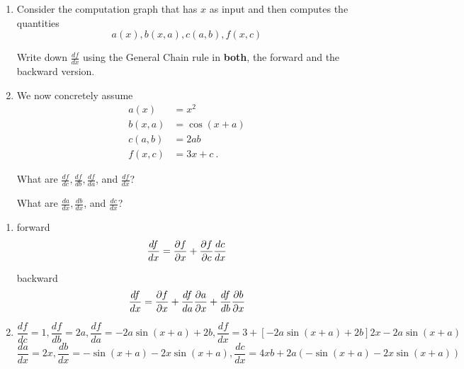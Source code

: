 

\renewcommand{\course}{Artificial Intelligence}
\renewcommand{\coursepicture}{course_ai}
\renewcommand{\coursedate}{Summer 2023}

\renewcommand{\exnum}{Exercise 6}

\exercises
\exercisestitle



\begin{enumerate}
\item Consider the computation graph that has $x$ as input and then computes
the quantities
$$ a(x), b(x,a), c(a,b), f(x,c) $$

Write down $\frac{df}{dx}$ using the General Chain rule in \textbf{both}, the forward and the backward version.

\item We now concretely assume
%
\begin{align*}
a(x) &= x^2 \\
b(x,a) &= \cos(x+a) \\
c(a,b) &= 2ab \\
f(x,c) &= 3x + c ~.
\end{align*}

What are $\frac{df}{dc}, \frac{df}{db}, \frac{df}{da}$, and $\frac{df}{dx}$? 

What are $\frac{da}{dx}, \frac{db}{dx}$, and $\frac{dc}{dx}$?
\end{enumerate}

\begin{solution}
\begin{enumerate}
\item forward
$$\frac{df}{dx} = \frac{\partial f}{\partial x} + \frac{\partial f}{\partial c} \frac{d c}{d x} $$

backward
$$\frac{df}{dx} = \frac{\partial f}{\partial x} + \frac{d f}{d a} \frac{\partial a}{\partial x} + \frac{d f}{d b} \frac{\partial b}{\partial x} $$

\item

$$\frac{df}{dc} = 1\comma \frac{df}{db} = 2a\comma  \frac{df}{da} = -2a \sin(x+a) + 2b \comma \frac{df}{dx} = 3 + [-2a \sin(x+a) + 2b] 2x - 2a\sin(x+a)$$
$$\frac{da}{dx} = 2x\comma \frac{db}{dx} = -\sin(x+a)-2x\sin(x+a)\comma \frac{dc}{dx} = 4xb + 2a(-\sin(x+a)-2x\sin(x+a))$$
\end{enumerate}
\end{solution}

